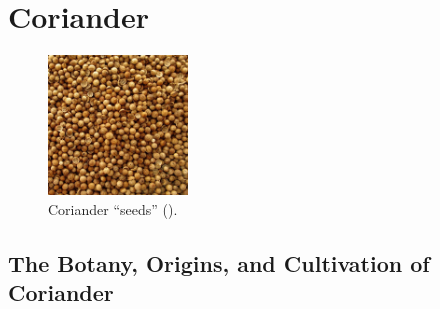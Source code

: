 \section{Coriander}
\label{sec:coriander}




\begin{figure}
	\vspace{-\baselineskip}
	\includegraphics[width=0.33\textwidth]{imgs/spices/coriander-1.jpg}
	\caption{Coriander ``seeds'' ().}
	\label{fig:coriander}
\end{figure}



\subsection{The Botany, Origins, and Cultivation of Coriander}


